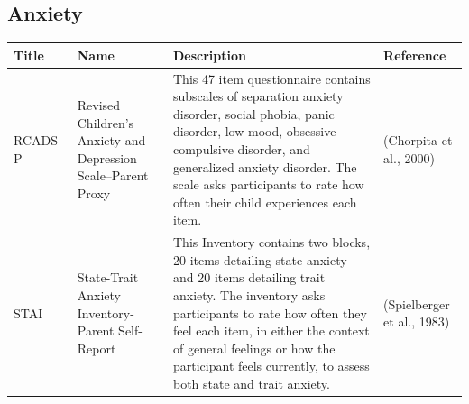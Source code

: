 \documentclass[]{book}
\begin{document}
\hypertarget{anxiety}{%
\subsection{Anxiety}\label{anxiety}}

\begin{longtable}[]{@{}llll@{}}
\toprule
\begin{minipage}[b]{0.13\columnwidth}\raggedright
Title\strut
\end{minipage} & \begin{minipage}[b]{0.21\columnwidth}\raggedright
Name\strut
\end{minipage} & \begin{minipage}[b]{0.38\columnwidth}\raggedright
Description\strut
\end{minipage} & \begin{minipage}[b]{0.15\columnwidth}\raggedright
Reference\strut
\end{minipage}\tabularnewline
\midrule
\endhead
\begin{minipage}[t]{0.13\columnwidth}\raggedright
RCADS--P\strut
\end{minipage} & \begin{minipage}[t]{0.21\columnwidth}\raggedright
Revised Children's Anxiety and Depression Scale--Parent Proxy\strut
\end{minipage} & \begin{minipage}[t]{0.38\columnwidth}\raggedright
This 47 item questionnaire contains subscales of separation anxiety disorder, social phobia, panic disorder, low mood, obsessive compulsive disorder, and generalized anxiety disorder. The scale asks participants to rate how often their child experiences each item.\strut
\end{minipage} & \begin{minipage}[t]{0.15\columnwidth}\raggedright
(Chorpita et al., 2000)\strut
\end{minipage}\tabularnewline
\begin{minipage}[t]{0.13\columnwidth}\raggedright
STAI\strut
\end{minipage} & \begin{minipage}[t]{0.21\columnwidth}\raggedright
State-Trait Anxiety Inventory-Parent Self-Report\strut
\end{minipage} & \begin{minipage}[t]{0.38\columnwidth}\raggedright
This Inventory contains two blocks, 20 items detailing state anxiety and 20 items detailing trait anxiety. The inventory asks participants to rate how often they feel each item, in either the context of general feelings or how the participant feels currently, to assess both state and trait anxiety.\strut
\end{minipage} & \begin{minipage}[t]{0.15\columnwidth}\raggedright
(Spielberger et al., 1983)\strut
\end{minipage}\tabularnewline
\bottomrule
\end{longtable}
\end{document}
